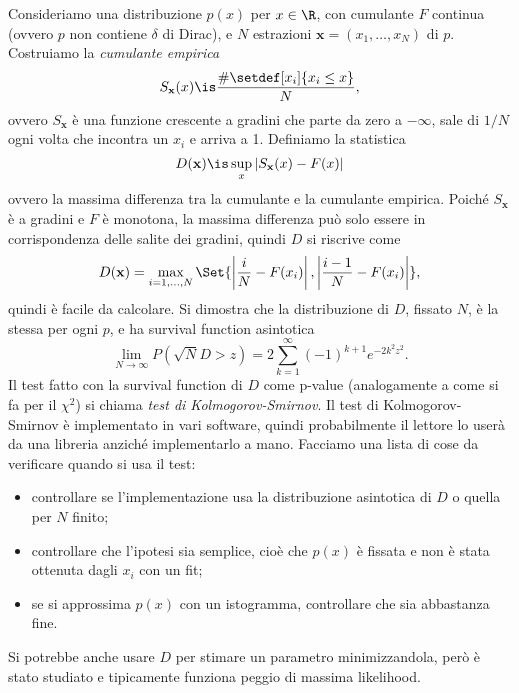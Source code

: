 Consideriamo una distribuzione $p(x)$ per $x\in\R$, con cumulante $F$ continua
(ovvero $p$ non contiene $\delta$ di Dirac), e $N$ estrazioni
$\mathbf x = (x_1, \dots, x_N)$ di $p$. Costruiamo la \emph{cumulante empirica} 
\begin{equation*}
	S_{\mathbf x}(x)
	\is \frac {\#\setdef[x_i]{x_i\le x}} N,
\end{equation*}
ovvero $S_{\mathbf x}$ è una funzione crescente a gradini che parte da zero a
$-\infty$, sale di $1/N$ ogni volta che incontra un $x_i$ e arriva a 1.
Definiamo la statistica
\begin{equation*}
	D(\mathbf x)
	\is \sup_x|S_\mathbf x(x)-F(x)|
\end{equation*}
ovvero la massima differenza tra la cumulante e la cumulante empirica. Poiché
$S_{\mathbf x}$ è a gradini e $F$ è monotona, la massima differenza può solo
essere in corrispondenza delle salite dei gradini, quindi $D$ si riscrive come
\begin{equation*}
	D(\mathbf x) = \max_{i=1,\dotsc,N}
    \Set{\left|\frac iN-F(x_i)\right|, \left|\frac{i-1}N-F(x_i)\right|},
\end{equation*}
quindi è facile da calcolare.
Si dimostra che la distribuzione di $D$, fissato $N$, è la stessa per ogni $p$,
e ha survival function asintotica
\begin{equation*}
	\lim_{N\to\infty} P(\sqrt N D>z)
	= 2 \sum_{k=1}^\infty (-1)^{k+1} e^{-2k^2z^2}.
\end{equation*}
Il test fatto con la survival function di $D$ come p-value (analogamente a come
si fa per il $\chi^2$) si chiama \emph{test di Kolmogorov-Smirnov}.
Il test di Kolmogorov-Smirnov è implementato in vari software, quindi
probabilmente il lettore lo userà da una libreria anziché implementarlo a mano.
Facciamo una lista di cose da verificare quando si usa il test:
\begin{itemize}
	\item controllare se l'implementazione usa la distribuzione asintotica di $D$ o quella per $N$ finito;
	\item controllare che l'ipotesi sia semplice,
	cioè che $p(x)$ è fissata e non è stata ottenuta dagli $x_i$ con un fit;
	\item se si approssima $p(x)$ con un istogramma, controllare che sia abbastanza fine.
\end{itemize}
Si potrebbe anche usare $D$ per stimare un parametro minimizzandola,
però è stato studiato e tipicamente funziona peggio di massima likelihood.
